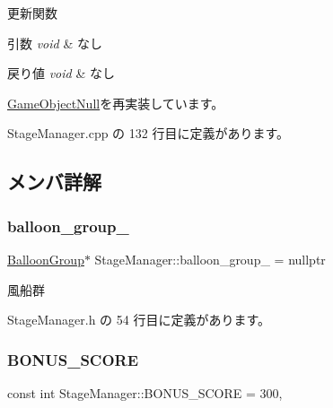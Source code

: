 更新関数 


\begin{DoxyParams}{引数}
{\em void} & なし \\
\hline
\end{DoxyParams}

\begin{DoxyRetVals}{戻り値}
{\em void} & なし \\
\hline
\end{DoxyRetVals}


\mbox{\hyperlink{class_game_object_null_aeeb51b7e7aa41fd0b16f8f7c016bdb55}{Game\+Object\+Null}}を再実装しています。



 Stage\+Manager.\+cpp の 132 行目に定義があります。



\subsection{メンバ詳解}
\mbox{\label{class_stage_manager_aac234fd37fef3fe233489e75c803ac47}} 
\subsubsection{\texorpdfstring{balloon\+\_\+group\+\_\+}{balloon\_group\_}}
{\footnotesize\ttfamily \mbox{\hyperlink{class_balloon_group}{Balloon\+Group}}$\ast$ Stage\+Manager\+::balloon\+\_\+group\+\_\+ = nullptr\hspace{0.3cm}{\ttfamily [private]}}



風船群 



 Stage\+Manager.\+h の 54 行目に定義があります。

\mbox{\label{class_stage_manager_aeced4abe9b4df7b0105dd42745506a25}} 
\subsubsection{\texorpdfstring{B\+O\+N\+U\+S\+\_\+\+S\+C\+O\+RE}{BONUS\_SCORE}}
{\footnotesize\ttfamily const int Stage\+Manager\+::\+B\+O\+N\+U\+S\+\_\+\+S\+C\+O\+RE = 300\hspace{0.3cm}{\ttfamily [static]}, {\ttfamily [private]}}



